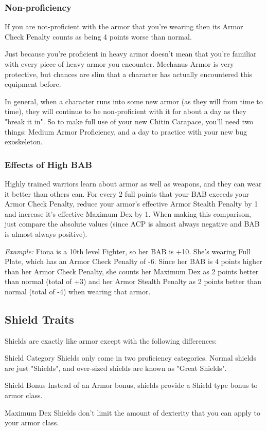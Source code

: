 \subsubsection{Non-proficiency}

If you are not-proficient with the armor that you're wearing then its Armor Check Penalty counts as being 4 points worse than normal.

Just because you're proficient in heavy armor doesn't mean that you're familiar with every piece of heavy armor you encounter. Mechanus Armor is very protective, but chances are slim that a character has actually encountered this equipment before.

In general, when a character runs into some new armor (as they will from time to time), they will continue to be non-proficient with it for about a day as they "break it in". So to make full use of your new Chitin Carapace, you'll need two things: Medium Armor Proficiency, and a day to practice with your new bug exoskeleton.

\subsubsection{Effects of High BAB}

Highly trained warriors learn about armor as well as weapons, and they can wear it better than others can. For every 2 full points that your BAB exceeds your Armor Check Penalty, reduce your armor's effective Armor Stealth Penalty by 1 and increase it's effective Maximum Dex by 1. When making this comparison, just compare the absolute values (since ACP is almost always negative and BAB is almost always positive).

\textit{Example:} Fiona is a 10th level Fighter, so her BAB is +10. She's wearing Full Plate, which has an Armor Check Penalty of -6. Since her BAB is 4 points higher than her Armor Check Penalty, she counts her Maximum Dex as 2 points better than normal (total of +3) and her Armor Stealth Penalty as 2 points better than normal (total of -4) when wearing that armor.

\subsection{Shield Traits}

Shields are exactly like armor except with the following differences:

\begin{description*}
\item[Shield Category] Shields only come in two proficiency categories. Normal shields are just "Shields", and over-sized shields are known as "Great Shields".

\item[Shield Bonus] Instead of an Armor bonus, shields provide a Shield type bonus to armor class.

\item[Maximum Dex] Shields don't limit the amount of dexterity that you can apply to your armor class.
\end{description*}

